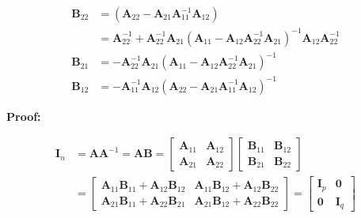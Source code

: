\documentclass[10pt,b5paper,titlepage]{book}
\begin{document}
\begin{itemize}
\begin{equation}
\begin{array}{ll}
                \mathbf{B}_{22} &= (\mathbf{A}_{22} - \mathbf{A}_{21} \mathbf{A}_{11}^{-1} \mathbf{A}_{12})\\
                       &= \mathbf{A}_{22}^{-1} + \mathbf{A}_{22}^{-1} \mathbf{A}_{21} (\mathbf{A}_{11} - \mathbf{A}_{12} \mathbf{A}_{22}^{-1} \mathbf{A}_{21})^{-1} \mathbf{A}_{12} \mathbf{A}_{22}^{-1}\\

                \mathbf{B}_{21} &= - \mathbf{A}_{22}^{-1} \mathbf{A}_{21} (\mathbf{A}_{11} - \mathbf{A}_{12} \mathbf{A}_{22}^{-1} \mathbf{A}_{21})^{-1}\\
                \mathbf{B}_{12} &= - \mathbf{A}_{11}^{-1} \mathbf{A}_{12} (\mathbf{A}_{22} - \mathbf{A}_{21} \mathbf{A}_{11}^{-1} \mathbf{A}_{12})^{-1}
            \end{array}
        \end{equation}

        \textbf{Proof:}

        \begin{equation}
            \begin{array}{ll}
                \mathbf{I}_{n} &= \mathbf{A} \mathbf{A}^{-1} = \mathbf{A} \mathbf{B} =
                \begin{bmatrix}
                    \mathbf{A}_{11} & \mathbf{A}_{12}\\
                    \mathbf{A}_{21} & \mathbf{A}_{22}
                \end{bmatrix}
                \begin{bmatrix}
                    \mathbf{B}_{11} & \mathbf{B}_{12}\\
                    \mathbf{B}_{21} & \mathbf{B}_{22}
                \end{bmatrix}\\
                               &=
                \begin{bmatrix}
                    \mathbf{A}_{11} \mathbf{B}_{11} + \mathbf{A}_{12} \mathbf{B}_{12} & \mathbf{A}_{11} \mathbf{B}_{12} + \mathbf{A}_{12} \mathbf{B}_{22}\\
                    \mathbf{A}_{21} \mathbf{B}_{11} + \mathbf{A}_{22} \mathbf{B}_{21} & \mathbf{A}_{21} \mathbf{B}_{12} + \mathbf{A}_{22} \mathbf{B}_{22}
                \end{bmatrix} =
                \begin{bmatrix}
                    \mathbf{I}_{p} & \mathbf{0}\\
                    \mathbf{0} & \mathbf{I}_{q}
                \end{bmatrix}
            \end{array}
        \end{equation}


\end{itemize}
\end{document}
